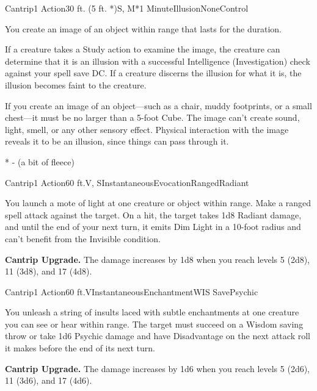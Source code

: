 
\begin{Spell}{Cantrip}{1 Action}{30 ft. (5 ft. *)}{S, M*}{1 Minute}{Illusion}{None}{Control}

You create an image of an object within range that lasts for the duration.

If a creature takes a Study action to examine the image, the creature can determine that it is an illusion with a successful Intelligence (Investigation) check against your spell save DC. If a creature discerns the illusion for what it is, the illusion becomes faint to the creature.

If you create an image of an object—such as a chair, muddy footprints, or a small chest—it must be no larger than a 5-foot Cube. The image can't create sound, light, smell, or any other sensory effect. Physical interaction with the image reveals it to be an illusion, since things can pass through it.

* - (a bit of fleece)

\end{Spell}


\begin{Spell}{Cantrip}{1 Action}{60 ft.}{V, S}{Instantaneous}{Evocation}{Ranged}{Radiant}

You launch a mote of light at one creature or object within range. Make a ranged spell attack against the target. On a hit, the target takes 1d8 Radiant damage, and until the end of your next turn, it emits Dim Light in a 10-foot radius and can't benefit from the Invisible condition.

\textbf{Cantrip Upgrade.} The damage increases by 1d8 when you reach levels 5 (2d8), 11 (3d8), and 17 (4d8).

\end{Spell}


\begin{Spell}{Cantrip}{1 Action}{60 ft.}{V}{Instantaneous}{Enchantment}{WIS Save}{Psychic}

You unleash a string of insults laced with subtle enchantments at one creature you can see or hear within range. The target must succeed on a Wisdom saving throw or take 1d6 Psychic damage and have Disadvantage on the next attack roll it makes before the end of its next turn.

\textbf{Cantrip Upgrade.} The damage increases by 1d6 when you reach levels 5 (2d6), 11 (3d6), and 17 (4d6).

\end{Spell}

